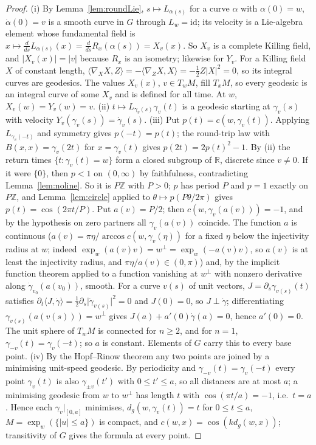 \documentclass[11pt,reqno]{amsart}
\theoremstyle{definition}
\theoremstyle{remark}
\numberwithin{equation}{section}
\newcommand{\R}{\mathbb{R}}
\newcommand{\Z}{\mathbb{Z}}
\begin{document}
\begin{proof}
(i) By Lemma~\ref{lem:roundLie}, $s\mapsto L_{\alpha(s)}$ for a curve $\alpha$ with $\alpha(0)=w$, $\dot\alpha(0)=v$ is a smooth curve in $G$ through
$L_w=\mathrm{id}$; its velocity is a Lie-algebra element whose fundamental field is $x\mapsto\frac d{ds}L_{\alpha(s)}(x)=\frac d{ds}R_x(\alpha(s))=X_v(x)$.
So $X_v$ is a complete Killing field, and $\lvert X_v(x)\rvert=\lvert v\rvert$ because $R_x$ is an isometry; likewise for $Y_v$.  For a Killing field $X$ of
constant length, $\langle\nabla_XX,Z\rangle=-\langle\nabla_ZX,X\rangle=-\frac12Z\lvert X\rvert^2=0$, so its integral curves are geodesics.  The values
$X_v(x)$, $v\in T_wM$, fill $T_xM$, so every geodesic is an integral curve of some $X_v$ and is defined for all time.  At $w$, $X_v(w)=Y_v(w)=v$.
(ii) $t\mapsto L_{\gamma_v(s)}\gamma_v(t)$ is a geodesic starting at $\gamma_v(s)$ with velocity $Y_v(\gamma_v(s))=\dot\gamma_v(s)$.
(iii) Put $p(t)=c(w,\gamma_v(t))$.  Applying $L_{\gamma_v(-t)}$ and symmetry gives $p(-t)=p(t)$; the round-trip law with $B(x,x)=\gamma_v(2t)$ for
$x=\gamma_v(t)$ gives $p(2t)=2p(t)^2-1$.  By (ii) the return times $\{t:\gamma_v(t)=w\}$ form a closed subgroup of $\R$, discrete since $v\ne0$.
If it were $\{0\}$, then $p<1$ on $(0,\infty)$ by faithfulness, contradicting Lemma~\ref{lem:noline}.  So it is $P\Z$ with $P>0$; $p$ has
period $P$ and $p=1$ exactly on $P\Z$, and Lemma~\ref{lem:circle} applied to $\theta\mapsto p(P\theta/2\pi)$ gives $p(t)=\cos(2\pi t/P)$.
Put $a(v)=P/2$; then $c(w,\gamma_v(a(v)))=-1$, and by the hypothesis on zero partners all $\gamma_v(a(v))$ coincide.  The function $a$ is
continuous ($a(v)=\pi\eta/\arccos c(w,\gamma_v(\eta))$ for a fixed $\eta$ below the injectivity radius at $w$; indeed
$\exp_w(a(v)v)=w^\perp=\exp_w(-a(v)v)$, so $a(v)$ is at least the injectivity radius, and $\pi\eta/a(v)\in(0,\pi)$) and, by the implicit function
theorem applied to a function vanishing at $w^\perp$ with nonzero derivative along $\dot\gamma_{v_0}(a(v_0))$, smooth.  For a curve $v(s)$ of
unit vectors, $J=\partial_s\gamma_{v(s)}(t)$ satisfies $\partial_t\langle J,\dot\gamma\rangle=\frac12\partial_s\lvert\dot\gamma_{v(s)}\rvert^2=0$ and $J(0)=0$, so
$J\perp\dot\gamma$; differentiating $\gamma_{v(s)}(a(v(s)))=w^\perp$ gives $J(a)+a'(0)\dot\gamma(a)=0$, hence $a'(0)=0$.  The unit sphere of $T_wM$ is
connected for $n\ge2$, and for $n=1$, $\gamma_{-v}(t)=\gamma_v(-t)$; so $a$ is constant.  Elements of $G$ carry this to every base point.
(iv) By the Hopf--Rinow theorem \cite[Ch.~6]{Lee18} any two points are joined by a minimising unit-speed geodesic.  By periodicity and
$\gamma_{-v}(t)=\gamma_v(-t)$ every point $\gamma_v(t)$ is also $\gamma_{\pm v}(t')$ with $0\le t'\le a$, so all distances are at most $a$; a minimising
geodesic from $w$ to $w^\perp$ has length $t$ with $\cos(\pi t/a)=-1$, i.e.\ $t=a$.  Hence each $\gamma_v|_{[0,a]}$ minimises, $d_g(w,\gamma_v(t))=t$
for $0\le t\le a$, $M=\exp_w(\{\lvert u\rvert\le a\})$ is compact, and $c(w,x)=\cos(kd_g(w,x))$; transitivity of $G$ gives the formula at every point.
\end{proof}
\end{document}
